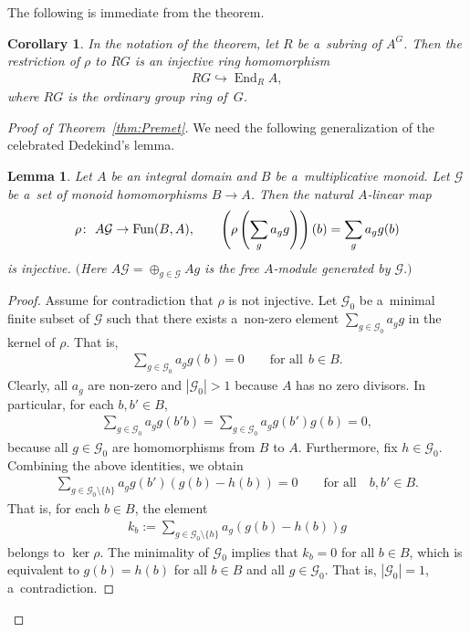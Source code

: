 \documentclass[pdftex]{sigma}
\DeclareMathOperator{\End}{End}
\newtheorem{Corollary}[Theorem]{Corollary}
\newtheorem{Lemma}[Theorem]{Lemma}
\begin{document}
The following is immediate from the theorem.

\begin{Corollary}
\label{cor:premet-dedekind}
In the notation of the theorem, let $R$ be a~subring of $A^G$.
Then the restriction of $\rho$ to $RG$ is an injective ring homomorphism
\begin{gather*}
RG\hookrightarrow \End_R A,
\end{gather*}
where $RG$ is the ordinary group ring of~$G$.
\end{Corollary}

\begin{proof}[Proof of Theorem~\ref{thm:Premet}]
We need the following generalization of the celebrated Dedekind's lemma.
\begin{Lemma}
\label{lem:dedekind}
Let $A$ be an integral domain and $B$ be a~multiplicative monoid.
Let $\mathcal G$ be a~set of monoid homomorphisms $B\to A$.
Then the natural $A$-linear map
\begin{gather*}
\rho\colon \ A\mathcal G \to {\rm Fun}(B,A),
\qquad
\left(\rho\left(\sum\limits_g a_g g\right)\right)(b) = \sum\limits_g a_g g(b)
\end{gather*}
is injective.
$($Here $A\mathcal G=\oplus_{g\in \mathcal G} Ag$ is the free $A$-module generated by $\mathcal G.)$
\end{Lemma}
\begin{proof}
Assume for contradiction that $\rho$ is not injective.
Let $\mathcal G _0$ be a~minimal f\/inite subset of $\mathcal G $ such that there exists a~non-zero element
$\sum\limits_{g\in \mathcal G _0}a_g g$ in the kernel of $\rho$.
That is,
\begin{gather*}
\sum\limits_{g\in \mathcal G _0}a_g g(b)=0
\qquad
\text{for all} \ \ b\in B.
\end{gather*}
Clearly, all $a_g$ are non-zero and $|\mathcal G _0|>1$ because $A$ has no zero divisors.
In particular, for each $b,b'\in B$,
\begin{gather*}
\sum\limits_{g\in \mathcal G _0} a_g g(b'b)=\sum\limits_{g\in \mathcal G _0} a_g g(b')g(b)=0,
\end{gather*}
because all $g\in \mathcal G _0$ are homomorphisms from $B$ to $A$.
Furthermore, f\/ix $h\in \mathcal G _0$.
Combining the above identities, we obtain
\begin{gather*}
\sum\limits_{g\in \mathcal G _0\setminus\{h\}} a_g g(b') (g(b) - h(b)) = 0
\qquad
\text{for all}\quad
b,b'\in B.
\end{gather*}
That is, for each $b\in B$, the element
\begin{gather*}
k_b:=\sum\limits_{g\in \mathcal G _0\setminus\{h\}} a_g (g(b) - h(b)) g
\end{gather*}
belongs to $\ker \rho$.
The minimality of $\mathcal G _0$ implies that $k_b=0$ for all $b\in B$, which is equivalent to $g(b)=h(b)$ for all
$b\in B$ and all $g\in \mathcal G _0$.
That is, $|\mathcal G _0|=1$, a~contradiction.
\end{proof}


\end{proof}
\end{document}
